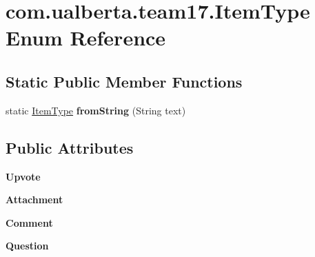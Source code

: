 \hypertarget{enumcom_1_1ualberta_1_1team17_1_1_item_type}{\section{com.\+ualberta.\+team17.\+Item\+Type Enum Reference}
\label{enumcom_1_1ualberta_1_1team17_1_1_item_type}
}
\subsection*{Static Public Member Functions}
\begin{DoxyCompactItemize}
\item 
\hypertarget{enumcom_1_1ualberta_1_1team17_1_1_item_type_a91792149d41dc95c6faabe35c5273aee}{static \hyperlink{enumcom_1_1ualberta_1_1team17_1_1_item_type}{Item\+Type} {\bfseries from\+String} (String text)}\label{enumcom_1_1ualberta_1_1team17_1_1_item_type_a91792149d41dc95c6faabe35c5273aee}

\end{DoxyCompactItemize}
\subsection*{Public Attributes}
\begin{DoxyCompactItemize}
\item 
\hypertarget{enumcom_1_1ualberta_1_1team17_1_1_item_type_ae0057d6bf417bd42c35013a6f138f41f}{{\bfseries Upvote}}\label{enumcom_1_1ualberta_1_1team17_1_1_item_type_ae0057d6bf417bd42c35013a6f138f41f}

\item 
\hypertarget{enumcom_1_1ualberta_1_1team17_1_1_item_type_aed1afbefd03aaee410275b02d0c1b0d7}{{\bfseries Attachment}}\label{enumcom_1_1ualberta_1_1team17_1_1_item_type_aed1afbefd03aaee410275b02d0c1b0d7}

\item 
\hypertarget{enumcom_1_1ualberta_1_1team17_1_1_item_type_a279a4962bbe0175339d2247f42af40ab}{{\bfseries Comment}}\label{enumcom_1_1ualberta_1_1team17_1_1_item_type_a279a4962bbe0175339d2247f42af40ab}

\item 
\hypertarget{enumcom_1_1ualberta_1_1team17_1_1_item_type_a3853c3cf1b52ffa0359c0ad4255a984e}{{\bfseries Question}}\label{enumcom_1_1ualberta_1_1team17_1_1_item_type_a3853c3cf1b52ffa0359c0ad4255a984e}

\end{DoxyCompactItemize}



